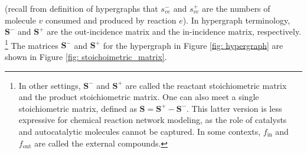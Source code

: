 \noindent (recall from definition of hypergraphs that $s_{ve}^-$ and $s_{ve}^+$ are the numbers of molecule $v$ consumed and produced by reaction $e$).
In hypergraph terminology, $\mathbf{S}^-$ and $\mathbf{S}^+$ are the out-incidence matrix and the in-incidence matrix, respectively.%
\footnote{
    In other settings, $\mathbf{S}^-$ and $\mathbf{S}^+$ are called the reactant stoichiometric matrix and the product stoichiometric matrix.
    One can also meet a single stoichiometric matrix, defined as $\mathbf{S} = \mathbf{S}^+ - \mathbf{S}^-$.
    This latter version is less expressive for chemical reaction network modeling, as the role of catalysts and autocatalytic molecules cannot be captured.
    In some contexts, $f_{\text{in}}$ and $f_{\text{out}}$ are called the external compounds.
}
The matrices $\mathbf{S}^-$ and $\mathbf{S}^+$ for the hypergraph in Figure \ref{fig: hypergraph} are shown in Figure \ref{fig: stoichoimetric_matrix}.

